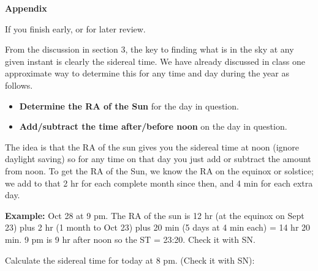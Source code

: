 \documentclass[12pt]{article}
\begin{document}
\bigskip
\bigskip
\noindent
{\bf Appendix}

\bigskip 
If you finish early, or for later review.

\medskip
From the discussion in section 3, the key to finding what is in the
sky at any given instant is clearly the sidereal time. We have already
discussed in class one approximate way to determine this for any time
and day during the year as follows.

\begin{itemize} 

\item{\bf Determine the RA of the Sun} for the day in question.

\item {\bf Add/subtract the time after/before noon} on the day in
question.

\end{itemize}
The idea is that the RA of the sun gives you the sidereal time at noon
(ignore daylight saving) so for any time on that day you just add or
subtract the amount from noon. To get the RA of the Sun, we know the
RA on the equinox or solstice; we add to that 2 hr for each complete
month since then, and 4 min for each extra day.

\bigskip
\noindent
{\bf Example:} Oct 28 at 9 pm. The RA of the sun is 12 hr (at the
equinox on Sept 23) plus 2 hr (1 month to Oct 23) plus 20 min (5 days
at 4 min each) = 14 hr 20 min. 9 pm is 9 hr after noon so the ST =
23:20. Check it with SN.

\bigskip
{} Calculate the sidereal time for today at 8
pm. (Check it with SN): \makebox[2cm]{\hrulefill}
\end{document}
